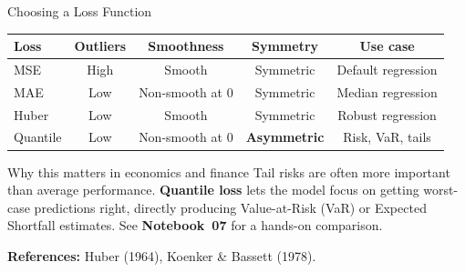 \documentclass[aspectratio=169,11pt]{beamer}
\begin{document}
\begin{frame}{Choosing a Loss Function}
\begin{center}
{\small
\renewcommand{\arraystretch}{1.4}
\begin{tabular}{lcccc}
\toprule
\textbf{Loss} & \textbf{Outliers} & \textbf{Smoothness} & \textbf{Symmetry} & \textbf{Use case} \\
\midrule
MSE      & High & Smooth          & Symmetric           & Default regression \\
MAE      & Low  & Non-smooth at 0 & Symmetric           & Median regression \\
Huber    & Low  & Smooth          & Symmetric           & Robust regression \\
Quantile & Low  & Non-smooth at 0 & \textbf{Asymmetric} & Risk, VaR, tails \\
\bottomrule
\end{tabular}
}%
\end{center}

\vspace{0.5cm}
\begin{alertblock}{Why this matters in economics and finance}
Tail risks are often more important than average performance.
\textbf{Quantile loss} lets the model focus on getting worst-case predictions right,
directly producing Value-at-Risk (VaR) or Expected Shortfall estimates.
See \textbf{Notebook~07} for a hands-on comparison.
\end{alertblock}

\vspace{0.2cm}
{\small \textbf{References:} Huber (1964), Koenker \& Bassett (1978).}
\end{frame}
\end{document}
